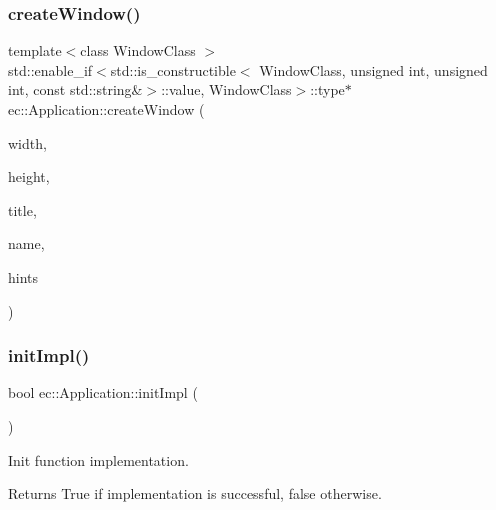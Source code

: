 \subsubsection{\texorpdfstring{create\+Window()}{createWindow()}\hspace{0.1cm}{\footnotesize\ttfamily [2/2]}}
{\footnotesize\ttfamily template$<$class Window\+Class $>$ \\
std\+::enable\+\_\+if$<$std\+::is\+\_\+constructible$<$ Window\+Class, unsigned int, unsigned int, const std\+::string\&$>$\+::value, Window\+Class$>$\+::type$\ast$ ec\+::\+Application\+::create\+Window (\begin{DoxyParamCaption}\item[{unsigned}]{width,  }\item[{unsigned}]{height,  }\item[{const std\+::string \&}]{title,  }\item[{const std\+::string \&}]{name,  }\item[{\mbox{\hyperlink{structec_1_1_window_creation_hints}{Window\+Creation\+Hints}}}]{hints }\end{DoxyParamCaption})}

\mbox{\label{classec_1_1_application_a1460d7083c312271285747a7cc03f7e8}} 
\subsubsection{\texorpdfstring{init\+Impl()}{initImpl()}}
{\footnotesize\ttfamily bool ec\+::\+Application\+::init\+Impl (\begin{DoxyParamCaption}{ }\end{DoxyParamCaption})\hspace{0.3cm}{\ttfamily [virtual]}}



Init function implementation. 

\begin{DoxyReturn}{Returns}
True if implementation is successful, false otherwise. 
\end{DoxyReturn}
\mbox{\label{classec_1_1_application_a8d6ef43e247b541017fa82e001c42995}} 
